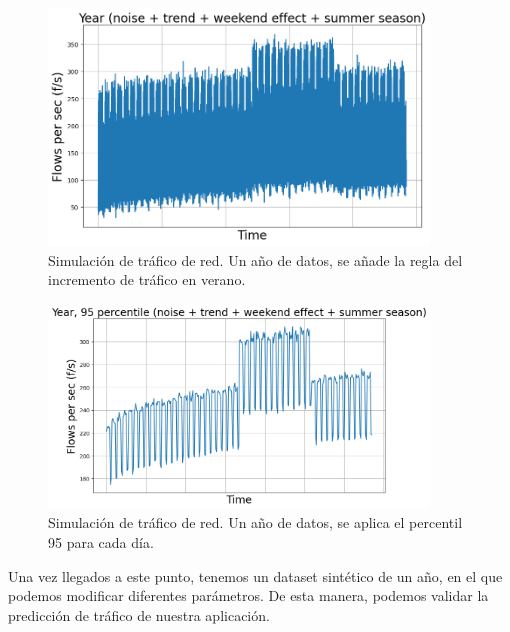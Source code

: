 \documentclass[a4paper, oneside, 12pt]{book}
\begin{document}
\begin{enumerate}
		\begin{figure}[h!]
			\includegraphics[width=0.9\textwidth, center]{img/anexo_6.png}
			\caption{Simulación de tráfico de red. Un año de datos, se añade la regla del incremento de tráfico en verano.}
			\label{img: anexo 6}
		\end{figure}
	
		\pagebreak
	
		\begin{figure}[h!]
			\includegraphics[width=0.9\textwidth, center]{img/anexo_7.png}
			\caption{Simulación de tráfico de red. Un año de datos, se aplica el percentil 95 para cada día.}
			\label{img: anexo 7}
		\end{figure}
	
		\noindent Una vez llegados a este punto, tenemos un dataset sintético de un año, en el que podemos modificar diferentes parámetros. De esta manera, podemos validar la predicción de tráfico de nuestra aplicación.
		
	\end{enumerate}
	
\end{document}
